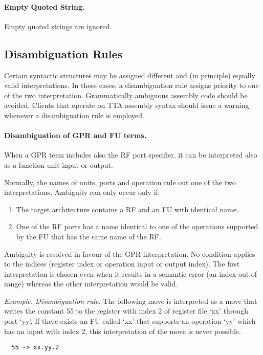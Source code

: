 \documentclass[twoside]{tceusermanual}
\begin{document}
\paragraph{Empty Quoted String.}
Empty quoted strings are ignored.

\subsection{Disambiguation Rules}

Certain syntactic structures may be assigned different and (in principle)
equally valid interpretations. In these cases, a disambiguation rule assigns
priority to one of the two interpretation.
%
Grammatically ambiguous assembly code should be avoided.  Clients that
operate on TTA assembly syntax should issue a warning whenever a
disambiguation rule is employed.

\paragraph{Disambiguation of GPR and FU terms.}
When a GPR term includes also the RF port specifier, it can be interpreted
also as a function unit input or output.

Normally, the names of units, ports and operation rule out one of the two
interpretations.  Ambiguity can only occur only if:
\begin{enumerate}
\item%
  The target architecture contains a RF and an FU with identical name.
\item%
  One of the RF ports has a name identical to one of the operations
  supported by the FU that has the same name of the RF.
%
\end{enumerate}

Ambiguity is resolved in favour of the GPR interpretation. No condition
applies to the indices (register index or operation input or output index).
The first interpretation is chosen even when it results in a semantic error
(an index out of range) whereas the other interpretation would be valid.

\emph{Example. Disambiguation rule.} The following move is interpreted as a
move that writes the constant 55 to the register with index 2 of
register file `xx' through port `yy'.  If there exists an FU called `xx'
that supports an operation `yy' which has an input with index 2, this
interpretation of the move is never possible.
\begin{verbatim}
  55 -> xx.yy.2
\end{verbatim}
\end{document}
